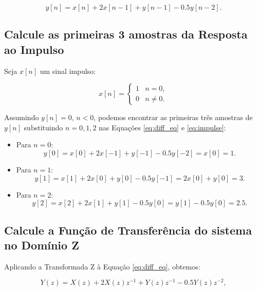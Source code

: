 \documentclass[a4paper,twoside,12pt]{article}
\begin{document}
	\begin{equation}
		y[n] = x[n] + 2 x[n-1] + y[n-1] - 0.5 y[n-2].
		\label{eq:diff_eq}
	\end{equation}
	
	\subsection{Calcule as primeiras 3 amostras da Resposta ao Impulso}
	
	Seja $x[n]$ um sinal impulso:
	
	\begin{equation}
		x[n] = \left\{
		\begin{array}{rl}
			1 & n = 0,\\
			0 & n \neq 0.
		\end{array} \right.
		\label{eq:impulse}
	\end{equation}
	
	Assumindo $y[n] = 0$, $n < 0$, podemos encontrar as primeiras três amostras de $y[n]$ substituindo $n = 0, 1, 2$ nas Equações \ref{eq:diff_eq} e \ref{eq:impulse}:
	
	\begin{itemize}
		\item Para $n=0$:
		\begin{equation}
			y[0] = x[0] + 2 x[-1] + y[-1] - 0.5 y[-2] = x[0] = 1.
		\end{equation}
		
		\item Para $n=1$:
		\begin{equation}
			y[1] = x[1] + 2 x[0] + y[0] - 0.5 y[-1] = 2x[0] + y[0] = 3.
		\end{equation}
		
		\item Para $n=2$:
		\begin{equation}
			y[2] = x[2] + 2 x[1] + y[1] - 0.5 y[0] = y[1] - 0.5 y[0] = 2.5.
		\end{equation}
	\end{itemize}
	
	\subsection{Calcule a Função de Transferência do sistema no Domínio Z}
	
	Aplicando a Transformada Z à Equação \ref{eq:diff_eq}, obtemos:
	
	\begin{equation}
		Y(z) = X(z) + 2 X(z) z^{-1} + Y(z) z^{-1} - 0.5 Y(z) z^{-2},
	\end{equation}
	
\end{document}
